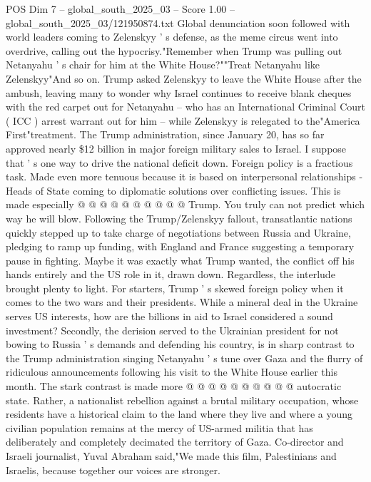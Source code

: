 \begin{textsample}{POS Dim 7 – global\_south\_2025\_03 – Score 1.00 – global\_south\_2025\_03/121950874.txt}  \label{ex:f7_pos_099}
Global denunciation soon followed with world leaders coming to Zelenskyy ' s defense, as the meme circus went into overdrive, calling out the hypocrisy."Remember when Trump was pulling out Netanyahu ' s chair for him at the White House?""Treat Netanyahu like Zelenskyy"And so on.
Trump asked Zelenskyy to leave the White House after the ambush, leaving many to wonder why Israel continues to receive blank cheques with the red carpet out for Netanyahu -- who has an International Criminal Court ( ICC ) arrest warrant out for him -- while Zelenskyy is relegated to the"America First"treatment.
The Trump administration, since January 20, has so far approved nearly \$12 billion in major foreign military sales to Israel.
I suppose that ' s one way to drive the national deficit down.
Foreign policy is a fractious task.
Made even more tenuous because it is based on interpersonal relationships - Heads of State coming to diplomatic solutions over conflicting issues.
This is made especially @ @ @ @ @ @ @ @ @ @ Trump.
You truly can not predict which way he will blow.
Following the Trump/Zelenskyy fallout, transatlantic nations quickly stepped up to take charge of negotiations between Russia and Ukraine, pledging to ramp up funding, with England and France suggesting a temporary pause in fighting.
Maybe it was exactly what Trump wanted, the conflict off his hands entirely and the US role in it, drawn down.
Regardless, the interlude brought plenty to light.
For starters, Trump ' s skewed foreign policy when it comes to the two wars and their presidents.
While a mineral deal in the Ukraine serves US interests, how are the billions in aid to Israel considered a sound investment?
Secondly, the derision served to the Ukrainian president for not bowing to Russia ' s demands and defending his country, is in sharp contrast to the Trump administration singing Netanyahu ' s tune over Gaza and the flurry of ridiculous announcements following his visit to the White House earlier this month.
The stark contrast is made more @ @ @ @ @ @ @ @ @ @ autocratic state.
Rather, a nationalist rebellion against a brutal military occupation, whose residents have a historical claim to the land where they live and where a young civilian population remains at the mercy of US-armed militia that has deliberately and completely decimated the territory of Gaza.
Co-director and Israeli journalist, Yuval Abraham said,"We made this film, Palestinians and Israelis, because together our voices are stronger.

\end{textsample}
